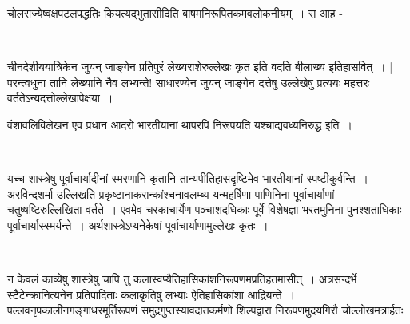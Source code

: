 चोलराज्येष्वक्षपटलपद्धतिः कियत्यद्भुतासीदिति बाषमनिरूपितकमवलोकनीयम्~। स आह -

\begin{myquote}

~\hfill {}
\end{myquote}

चीनदेशीययात्रिकेन जुयन् जाङ्गेन  प्रतिपुरं  लेख्यराशेरुल्लेखः कृत इति वदति बीलाख्य इतिहासवित्~।  | परन्त्वधुना तानि लेख्यानि नैव लभ्यन्ते! साधारण्येन जुयन् जाङ्गेन दत्तेषु उल्लेखेषु प्रत्ययः महत्तरः वर्ततेऽन्यदत्तोल्लेखापेक्षया~।

वंशावलिविलेखन एव प्रधान आदरो भारतीयानां थापरपि निरूपयति यश्चाद्यवध्यनिरुद्ध इति~।

\begin{myquote}

~\hfill {}
\end{myquote}

यच्च शास्त्रेषु पूर्वाचार्यादीनां स्मरणानि कृतानि तान्यपीतिहासदृष्टिमेव भारतीयानां स्पष्टीकुर्वन्ति~। अरविन्दशर्मा उल्लिखति प्रकृष्टानाकरान्कांश्चनावलम्ब्य यन्महर्षिणा पाणिनिना पूर्वाचार्याणां चतुष्षष्टिरुल्लिखिता वर्तते~। एवमेव चरकाचार्येण पञ्चाशदधिकाः पूर्वे विशेषज्ञा भरतमुनिना पुनश्शताधिकाः पूर्वाचार्यास्स्मर्यन्ते~। अर्थशास्त्रेऽप्यनेकेषां पूर्वाचार्याणामुल्लेखः कृतः~। 

~\hfill {} 

न केवलं काव्येषु शास्त्रेषु चापि तु कलास्वप्यैतिहासिकांशनिरूपणमप्रतिहतमासीत्~। अत्रसन्दर्भे स्टैटेन्क्रानित्यनेन प्रतिपादिताः कलाकृतिषु लभ्याः ऐतिहासिकांशा आद्रियन्ते~। पल्लवनृपकालीनगङ्गाधरमूर्तिरूपणं समुद्रगुप्तस्यावदातकर्मणो शिल्पद्वारा निरूपणमुदयगिरौ चोल्लोखमत्रार्हतः 

